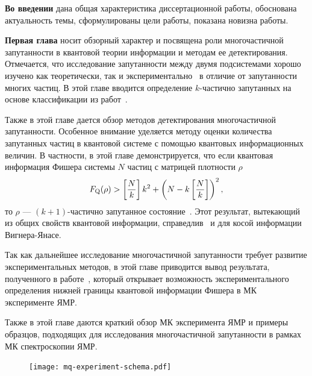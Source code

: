 \textbf{Во введении} дана общая характеристика диссертационной работы,
обоснована актуальность темы,
сформулированы цели работы,
показана новизна работы.

\textbf{Первая глава} носит обзорный характер и посвящена роли многочастичной запутанности в квантовой теории информации и методам ее детектирования.
Отмечается, что исследование запутанности между двумя подсистемами хорошо изучено как теоретически, так и экспериментально~\cite{Aldoshin2012} в отличие от запутанности многих частиц.
В этой главе вводится определение $k$-частично запутанных на основе классификации из работ~\cite{Seevinck2001,Chen2005, Guhne2005}.

% 

Также в этой главе дается обзор методов детектирования многочастичной запутанности.
Особенное внимание уделяется методу оценки количества запутанных частиц в квантовой системе с помощью квантовых информационных величин.
В частности, в этой главе демонстрируется,
что если квантовая информация Фишера системы $N$ частиц с матрицей плотности $\rho$
%
\begin{equation}\label{eq:qfi-entanglement-criteria}
  F_\mathrm{Q}(\rho) > \left[ \frac N k \right] k^2 + \left( N - k \left[ \frac N k \right] \right)^2,
\end{equation}
%
то $\rho$ --- $(k+1)$-частично запутанное состояние~\cite{Hyllus2012}.
Этот результат,
вытекающий из общих свойств квантовой информации,
справедлив~\cite{Chen2005} и для косой информации Вигнера-Янасе.

Так как дальнейшее исследование многочастичной запутанности требует развитие экспериментальных методов,
в этой главе приводится вывод результата, полученного в работе~\cite{Garttner2018},
который открывает возможность экспериментального определения нижней границы квантовой информации Фишера в МК эксперименте ЯМР.

Также в этой главе даются краткий обзор МК эксперимента ЯМР
и примеры образцов, подходящих для исследования многочастичной запутанности в рамках МК спектроскопии ЯМР.


\begin{figure}[H]
  \centering
  \texttt{[image: mq-experiment-schema.pdf]}
  \caption{\protect}
  \label{fig:mq-experiment-schema}
\end{figure}


